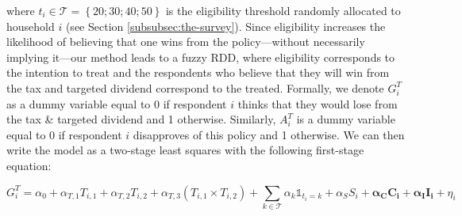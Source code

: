 \documentclass[12pt]{article} %
\newcommand{\un}{\mathds{1}} %
\begin{document}
\noindent
where $t_i\in \mathcal{T}=\left\{20;30;40;50\right\}$ is the eligibility threshold randomly allocated to household $i$ (see Section \ref{subsubsec:the-survey}). Since eligibility increases the likelihood of believing that one wins from the policy---without necessarily implying it---our method leads to a fuzzy RDD, where eligibility corresponds to the intention to treat and the respondents who believe that they will win from the tax and targeted dividend correspond to the treated. Formally, we denote $G_i^T$ as a dummy variable equal to 0 if respondent $i$ thinks that they would lose from the tax \& targeted dividend and 1 otherwise. Similarly, $A_i^T$ is a dummy variable equal to 0 if respondent $i$ disapproves of this policy and 1 otherwise. We can then write the model as a two-stage least squares with the following first-stage equation:


\vspace{-0.5cm}

\begin{equation}
    G_i^T = \alpha_0 + \alpha_{T,1} T_{i,1} + \alpha_{T,2} T_{i,2} + \alpha_{T,3} \left( T_{i,1} \times T_{i,2} \right) + \sum_{k\in\mathcal{T}} \alpha_k \un_{t_i=k}  + \alpha_S S_i + \mathbf{\alpha_C C_i} + \mathbf{\alpha_I I_i} + \eta_i
    \label{eq:first_stage_parametric_rdd_approve_winner}
\end{equation}

\vspace{0.2cm}
\end{document}
